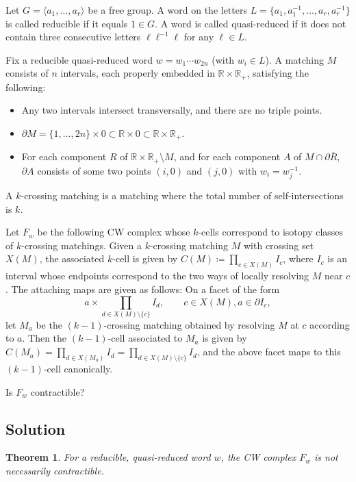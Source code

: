 \documentclass[12pt]{article}
\newtheorem{theorem}{Theorem}
\newcommand{\RR}{\mathbb{R}}
\newcommand{\bdy}{\partial}
\newcommand{\defeq}{\coloneqq}
\begin{document}
Let $G=\langle a_1,\dots,a_r\rangle$ be a free group. A word on the
letters $L=\{a_1,a_1^{-1},\dots,a_r,a_r^{-1}\}$ is called reducible
if it equals $1\in G$. A word is called quasi-reduced if it does not
contain three consecutive letters $\ell\ell^{-1}\ell$ for any
$\ell \in L$.

Fix a reducible quasi-reduced word $w=w_1\cdots w_{2n}$ (with $w_i\in L$). A
matching $M$ consists of $n$ intervals, each properly embedded in
$\RR\times\RR_+$, satisfying the following:
\begin{itemize}
\item Any two intervals intersect
  transversally, and there are no triple points.
\item $\bdy M=\{1,\dots,2n\}\times 0\subset\RR\times 0\subset
  \RR\times\RR_+$.
\item For each component $R$ of
  $\RR\times\RR_+\setminus M$, and for each component $A$ of $M\cap \bdy\overline{R}$, $\bdy A$ consists of some two points $(i,0)$ and $(j,0)$ with $w_i=w_j^{-1}$. 
\end{itemize}
A $k$-crossing
matching is a matching where the total number of self-intersections
is $k$.

Let $F_w$ be the following CW complex whose $k$-cells correspond to
isotopy classes of $k$-crossing matchings. Given a $k$-crossing
matching $M$ with crossing set $X(M)$, the associated $k$-cell is
given by $C(M)\defeq \prod_{c\in X(M)}I_c$, where $I_c$ is an
interval whose endpoints correspond to the two ways of locally
resolving $M$ near $c$. The attaching maps are given as follows: On
a facet of the form
\[
  a\times\prod_{d\in X(M)\setminus\{c\}}I_{d},\qquad c\in X(M),a\in \bdy I_c,
\]
let $M_a$ be the $(k-1)$-crossing matching obtained by resolving $M$
at $c$ according to $a$. Then the $(k-1)$-cell associated to $M_a$
is given by
$C(M_a)=\prod_{d\in X(M_a)}I_d=\prod_{d\in X(M)\setminus\{c\}}I_{d}$, and the
above facet maps to this $(k-1)$-cell canonically.

Is $F_w$ contractible?

\subsection*{Solution}

\begin{theorem}
For a reducible, quasi-reduced word $w$, the CW complex $F_w$ is not necessarily contractible.
\end{theorem}
\end{document}
